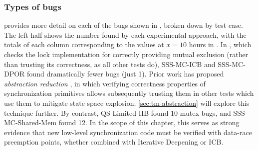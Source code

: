 \subsubsection{Types of bugs}

 provides more detail on each of the bugs shown in ,
broken down by test case.
The left half shows the number found by each experimental approach,
with the totals of each column corresponding to the values at $x=10$ hours in .
In \mxtest, which checks the lock implementation for correctly providing mutual exclusion
(rather than trusting its correctness, as all other tests do),
SSS-MC-ICB and SSS-MC-DPOR
found dramatically fewer bugs (just 1).
Prior work has proposed {\em abstraction reduction} \cite{dbug-phdthesis},
in which verifying correctness properties of synchronization primitives
allows subsequently trusting them in other tests which use them to mitigate state space explosion;
\cref{sec:tm-abstraction} will explore this technique further.
By contrast, QS-Limited-HB found 10 mutex bugs, and SSS-MC-Shared-Mem found 12.
In the scope of this chapter,
this serves as strong evidence that new low-level synchronization code must be verified with data-race preemption points,
whether combined with Iterative Deepening or ICB.

